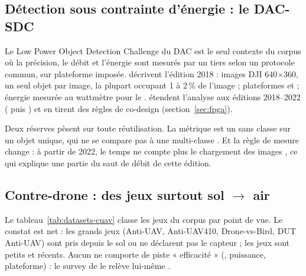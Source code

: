\subsection{Détection sous contrainte d'énergie : le DAC-SDC}

Le Low Power Object Detection Challenge du DAC est le seul contexte du corpus où la
précision, le débit et l'énergie sont mesurés par un tiers selon un protocole commun, sur
plateforme imposée. \citet{2021-xu-dac-sdc-low-power-object} décrivent l'édition 2018 :
images DJI 640$\times$360, un seul objet par image, la plupart occupant 1 à 2\,\% de
l'image ; plateformes  et  ; énergie mesurée au wattmètre pour le 
. \citet{2024-zhang-comprehensive-analysis-dac-sdc-fpga} étendent l'analyse aux
éditions 2018--2022 ( puis ) et en tirent des règles de co-design
(section~\ref{sec:fpga}).

Deux réserves pèsent sur toute réutilisation. La métrique est un  sans classe
sur un objet unique, qui ne se compare pas à une  multi-classe
\citep[§2.3]{2024-zhang-comprehensive-analysis-dac-sdc-fpga}. Et la règle de mesure
change : à partir de 2022, le temps ne compte plus le chargement des images ,
ce qui explique une partie du saut de débit de cette édition.

\subsection{Contre-drone : des jeux surtout sol $\rightarrow$ air}

Le tableau~\ref{tab:datasets-cuav} classe les jeux du corpus par point de vue. Le constat
est net : les grands jeux (Anti-UAV, Anti-UAV410, Drone-vs-Bird, DUT Anti-UAV) sont pris
depuis le sol ou ne déclarent pas le capteur ; les jeux  sont petits
et récents. Aucun ne comporte de piste « efficacité » (, puissance, plateforme) : le
survey de \citet{arxiv-2507.10006-vision-anti-unmanned-aerial-technology}\pp{} le relève
lui-même .

